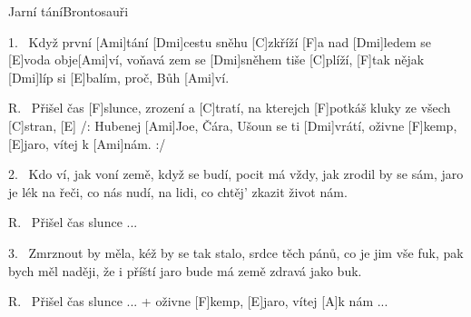 \begin{song}{Jarní tání}{Brontosauři}

\begin{xverse}{1.~}
Když první [Ami]tání [Dmi]cestu sněhu [C]zkříží
[F]a nad [Dmi]ledem se [E]voda obje[Ami]ví,
voňavá zem se [Dmi]sněhem tiše [C]plíží,
[F]tak nějak [Dmi]líp si [E]balím, proč, Bůh [Ami]ví.
\end{xverse}

\begin{xverse}{R.~}
Přišel čas [F]slunce, zrození a [C]tratí,
na kterejch [F]potkáš kluky ze všech [C]stran, [E]{}
/: Hubenej [Ami]Joe, Čára, Ušoun se ti [Dmi]vrátí,
oživne [F]kemp, [E]jaro, vítej k [Ami]nám. :/
\end{xverse}

\begin{xverse}{2.~}
Kdo ví, jak voní země, když se budí,
pocit má vždy, jak zrodil by se sám,
jaro je lék na řeči, co nás nudí,
na lidi, co chtěj' zkazit život nám.
\end{xverse}

\begin{xverse}{R.~}
Přišel čas slunce ...
\end{xverse}

\begin{xverse}{3.~}
Zmrznout by měla, kéž by se tak stalo,
srdce těch pánů, co je jim vše fuk,
pak bych měl naději, že i příští jaro
bude má země zdravá jako buk.
\end{xverse}

\begin{xverse}{R.~}
Přišel čas slunce ...
+ oživne [F]kemp, [E]jaro, vítej [A]k nám ...
\end{xverse}

\end{song}

